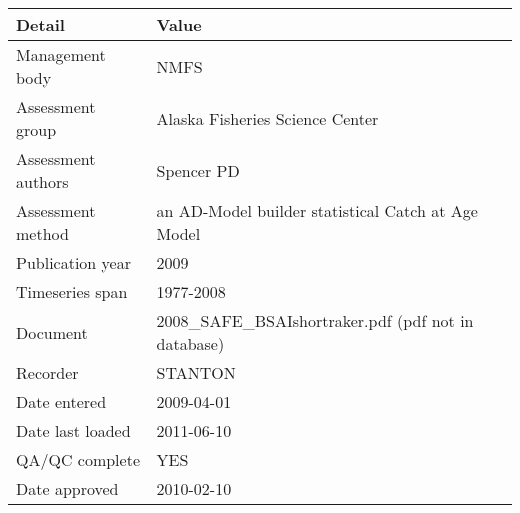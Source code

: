 \begin{table}[htb]
\centering
\begin{tabular}{lp{7cm}}
\toprule
Detail & Value \\
\midrule
Management body    & NMFS                                                 \\
Assessment group   & Alaska Fisheries Science Center                      \\
Assessment authors & Spencer PD                                           \\
Assessment method  & an AD-Model builder statistical Catch at Age Model   \\
Publication year   & 2009                                                 \\
Timeseries span    & 1977-2008                                            \\
Document           & 2008\_SAFE\_BSAIshortraker.pdf (pdf not in database) \\
Recorder           & STANTON                                              \\
Date entered       & 2009-04-01                                           \\
Date last loaded   & 2011-06-10                                           \\
QA/QC complete     & YES                                                  \\
Date approved      & 2010-02-10                                           \\
\bottomrule
\end{tabular}
\label{tab:assessdet}
\end{table}
